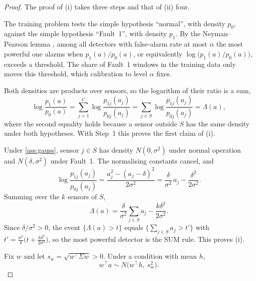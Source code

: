 \begin{proof}
The proof of (i) takes three steps and that of (ii) four.

 The training problem tests the simple hypothesis ``normal'', with density $p_0$, against the simple hypothesis ``Fault~1'', with density $p_1$. By the Neyman--Pearson lemma \citep[Thm.~3.2.1]{neyman1933,lehmann2005}, among all detectors with false-alarm rate at most $\alpha$ the most powerful one alarms when $p_1(a)/p_0(a)$, or equivalently $\log\big(p_1(a)/p_0(a)\big)$, exceeds a threshold. The share of Fault~1 windows in the training data only moves this threshold, which calibration to level $\alpha$ fixes.

 Both densities are products over sensors, so the logarithm of their ratio is a sum,
\begin{equation}\label{eq:llr-sum}
  \log\frac{p_1(a)}{p_0(a)}
  =\sum_{j=1}^C\log\frac{p_{1j}(a_j)}{p_{0j}(a_j)}
  =\sum_{j\in S}\log\frac{p_{1j}(a_j)}{p_{0j}(a_j)}=\Lambda(a),
\end{equation}
where the second equality holds because a sensor outside $S$ has the same density under both hypotheses. With Step~1 this proves the first claim of (i).

 Under \cref{ass:gauss}, sensor $j\in S$ has density $N(0,\sigma^2)$ under normal operation and $N(\delta,\sigma^2)$ under Fault~1. The normalising constants cancel, and
\begin{equation}\label{eq:gauss-term}
  \log\frac{p_{1j}(a_j)}{p_{0j}(a_j)}
  =\frac{a_j^2-(a_j-\delta)^2}{2\sigma^2}
  =\frac{\delta}{\sigma^2}\,a_j-\frac{\delta^2}{2\sigma^2}.
\end{equation}
Summing over the $k$ sensors of $S$,
\begin{equation}\label{eq:gauss-llr}
  \boxed{\;\Lambda(a)=\frac{\delta}{\sigma^2}\sum_{j\in S}a_j-\frac{k\delta^2}{2\sigma^2}.\;}
\end{equation}
Since $\delta/\sigma^2>0$, the event $\{\Lambda(a)>t\}$ equals $\{\sum_{j\in S}a_j>t'\}$ with $t'=\frac{\sigma^2}{\delta}\big(t+\frac{k\delta^2}{2\sigma^2}\big)$, so the most powerful detector is the SUM rule. This proves (i).

 Fix $w$ and let $s_w=\sqrt{w^\top\Sigma w}>0$. Under a condition with mean $h$,
\begin{equation}\label{eq:score-law}
  w^\top a\sim N\big(w^\top h,\ s_w^2\big).
\end{equation}


\end{proof}
